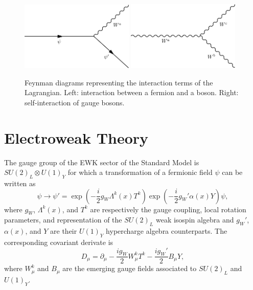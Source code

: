     \begin{figure}[h!]
      \centering
      \includegraphics[width=0.48\textwidth]{img/I-1-standard-model/diagram-fermion-boson.png}
      \includegraphics[width=0.48\textwidth]{img/I-1-standard-model/diagram-boson-boson.png}
      \caption{Feynman diagrams representing the interaction terms of the Lagrangian. Left: interaction between a fermion and a boson. Right: self-interaction of gauge bosons.}
      \label{fig:I-1-diagram}
    \end{figure}

  \section{Electroweak Theory}

    The gauge group of the EWK sector of the Standard Model is $ SU(2)_L \otimes U(1)_Y $ for which a transformation of a fermionic field $ \psi $ can be written as
    \begin{equation}
      \psi \rightarrow \psi' = \exp\left(- \frac{i}{2} g_W \Lambda^k(x) T^k \right) \exp\left(- \frac{i}{2} g_W' \alpha(x) Y \right) \psi ,
    \end{equation}
    where $ g_W $, $ \Lambda^k(x) $, and $ T^k $ are respectively the gauge coupling, local rotation parameters, and representation of the $ SU(2)_L $ weak isospin algebra and $ g_W' $, $ \alpha(x) $, and $ Y $ are their $ U(1)_Y $ hypercharge algebra counterparts. The corresponding covariant derivate is
    \begin{equation}
      D_\mu = \partial_\mu - \frac{i g_W}{2} W^k_\mu T^k - \frac{i g_W'}{2} B_\mu Y ,
    \end{equation}
    where $ W^k_\mu $ and $ B_\mu$ are the emerging gauge fields associated to $ SU(2)_L $ and $ U(1)_Y $. \\

